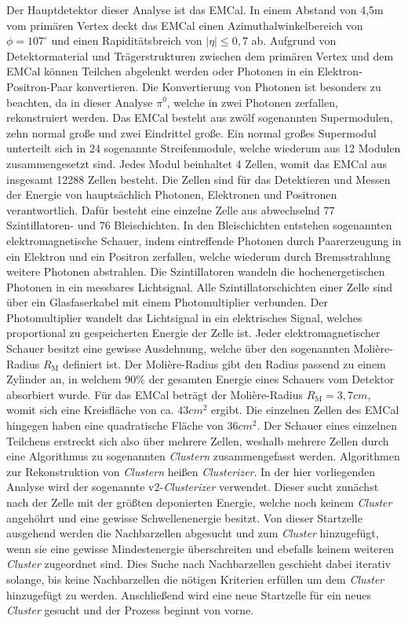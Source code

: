 Der Hauptdetektor dieser Analyse ist das EMCal.
In einem Abstand von 4,5m vom prim\"aren Vertex deckt das EMCal einen Azimuthalwinkelbereich von $\phi=107^{\circ}$ und einen Rapidit\"atsbreich von $ |\eta| \leq 0,7$ ab.
Aufgrund von Detektormaterial und Tr\"agerstrukturen zwischen dem prim\"aren Vertex und dem EMCal k\"onnen Teilchen abgelenkt werden oder Photonen in ein Elektron-Positron-Paar konvertieren.
Die Konvertierung von Photonen ist besonders zu beachten, da in dieser Analyse $\pi^{0}$, welche in zwei Photonen zerfallen, rekonstruiert werden.
\newline
Das EMCal besteht aus zw\"olf sogenannten Supermodulen, zehn normal gro{\ss}e und zwei Eindrittel gro{\ss}e.
Ein normal gro{\ss}es Supermodul unterteilt sich in 24 sogenannte Streifenmodule, welche wiederum aus 12 Modulen zusammengesetzt sind.
Jedes Modul beinhaltet 4 Zellen, womit das EMCal aus insgesamt 12288 Zellen besteht.
Die Zellen sind f\"ur das Detektieren und Messen der Energie von haupts\"achlich Photonen, Elektronen und Positronen verantwortlich.
Daf\"ur besteht eine einzelne Zelle aus abwechselnd 77 Szintillatoren- und 76 Bleischichten.
In den Bleischichten entstehen sogenannten elektromagnetische Schauer, indem eintreffende Photonen durch Paarerzeugung in ein Elektron und ein Positron zerfallen, welche wiederum durch Bremsstrahlung weitere Photonen abstrahlen.
Die Szintillatoren wandeln die hochenergetischen Photonen in ein messbares Lichtsignal.
Alle Szintillatorschichten einer Zelle sind \"uber ein Glasfaserkabel mit einem Photomultiplier verbunden.
Der Photomultiplier wandelt das Lichtsignal in ein elektrisches Signal, welches proportional zu gespeicherten Energie der Zelle ist.
\newline
Jeder elektromagnetischer Schauer besitzt eine gewisse Ausdehnung, welche \"uber den sogenannten Moli\`ere-Radius $R_{\text{M}}$ definiert ist.
Der Moli\`ere-Radius gibt den Radius passend zu einem Zylinder an, in welchem 90\% der gesamten Energie eines Schauers vom Detektor absorbiert wurde.
F\"ur das EMCal betr\"agt der Moli\`ere-Radius $R_{\text{M}} = 3,7 cm$, womit sich eine Kreisfl\"ache von ca. $43 cm^{2}$ ergibt.
Die einzelnen Zellen des EMCal hingegen haben eine quadratische Fl\"ache von $36 cm^{2}$. 
Der Schauer eines einzelnen Teilchens erstreckt sich also \"uber mehrere Zellen, weshalb mehrere Zellen durch eine Algorithmus zu sogenannten \textit{Clustern} zusammengefasst werden.
Algorithmen zur Rekonstruktion von \textit{Clustern} hei{\ss}en \textit{Clusterizer}.
In der hier vorliegenden Analyse wird der sogenannte v2-\textit{Clusterizer} verwendet.
Dieser sucht zun\"achst nach der Zelle mit der gr\"o{\ss}ten deponierten Energie, welche noch keinem \textit{Cluster} angeh\"ohrt und eine gewisse Schwellenenergie besitzt.
Von dieser Startzelle ausgehend werden die Nachbarzellen abgesucht und zum \textit{Cluster} hinzugef\"ugt, wenn sie eine gewisse Mindestenergie \"uberschreiten und ebefalls keinem weiteren \textit{Cluster} zugeordnet sind.
Dies Suche nach Nachbarzellen geschieht dabei iterativ solange, bis keine Nachbarzellen die n\"otigen Kriterien erf\"ullen um dem \textit{Cluster} hinzugef\"ugt zu werden.
Anschlie{\ss}end wird eine neue Startzelle f\"ur ein neues \textit{Cluster} gesucht und der Prozess beginnt von vorne.

